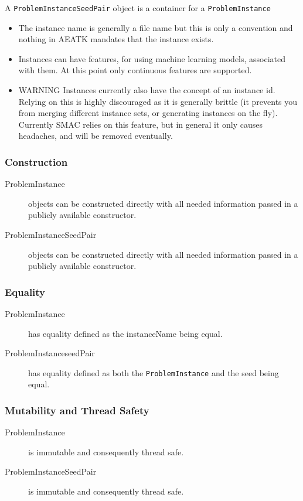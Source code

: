\documentclass[11pt,letterpaper,oneside]{article}
\begin{document}
A \texttt{ProblemInstanceSeedPair} object is a container for a \texttt{ProblemInstance}




\begin{itemize}
\item The instance name is generally a file name but this is only a convention and nothing in AEATK mandates that the instance exists.
\item Instances can have features, for using machine learning models, associated with them. At this point only continuous features are supported.
\item \textsc{WARNING} Instances currently also have the concept of an instance id. Relying on this is highly discouraged as it is generally brittle (it prevents you from merging different instance sets, or generating instances on the fly). Currently SMAC relies on this feature, but in general it only causes headaches, and will be removed eventually.

\end{itemize}

\subsubsection{Construction}
\begin{description}
\item[ProblemInstance] objects can be constructed directly with all needed information passed in a publicly available constructor.
\item[ProblemInstanceSeedPair] objects can be constructed directly with all needed information passed in a publicly available constructor.
\end{description}


\subsubsection{Equality}
\begin{description}
\item[ProblemInstance] has equality defined as the instanceName being equal.
\item[ProblemInstanceseedPair] has equality defined as both the \texttt{ProblemInstance} and the seed being equal.
\end{description}

\subsubsection{Mutability and Thread Safety}
\begin{description}
\item[ProblemInstance] is immutable and consequently thread safe.
\item[ProblemInstanceSeedPair] is immutable and consequently thread safe.
\end{description}
\end{document}
